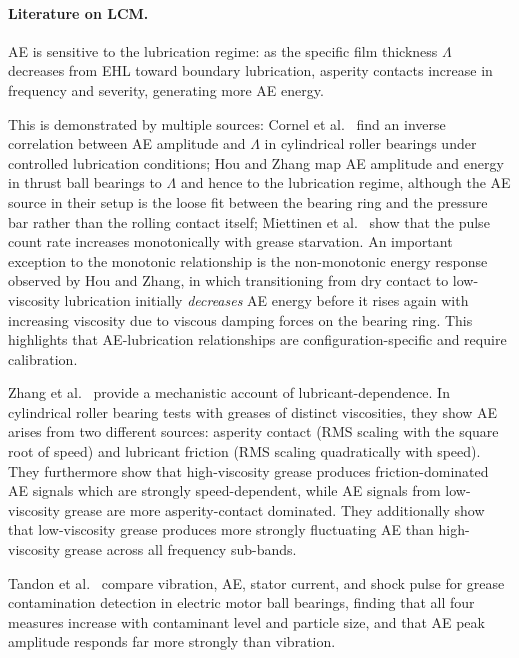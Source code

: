 \paragraph{Literature on LCM.} AE is sensitive to the lubrication regime: as the specific film thickness $\Lambda$ decreases from EHL toward boundary lubrication, asperity contacts increase in frequency and severity, generating more AE energy.

This is demonstrated by multiple sources: Cornel et al.\ \cite{cornel_condition_2021} find an inverse correlation between AE amplitude and $\Lambda$ in cylindrical roller bearings under controlled lubrication conditions; Hou and Zhang \cite{hou_-situ_2025} map AE amplitude and energy in thrust ball bearings to $\Lambda$ and hence to the lubrication regime, although the AE source in their setup is the loose fit between the bearing ring and the pressure bar rather than the rolling contact itself; Miettinen et al.\ \cite{miettinen_analysis_2001} show that the pulse count rate increases monotonically with grease starvation. An important exception to the monotonic relationship is the non-monotonic energy response observed by Hou and Zhang, in which transitioning from dry contact to low-viscosity lubrication initially \textit{decreases} AE energy before it rises again with increasing viscosity due to viscous damping forces on the bearing ring. This highlights that AE-lubrication relationships are configuration-specific and require calibration.

Zhang et al.\ \cite{zhang_coupled_2026} provide a mechanistic account of lubricant-dependence. In cylindrical roller bearing tests with greases of distinct viscosities, they show AE arises from two different sources: asperity contact (RMS scaling with the square root of speed) and lubricant friction (RMS scaling quadratically with speed). They furthermore show that high-viscosity grease produces friction-dominated AE signals which are strongly speed-dependent, while AE signals from low-viscosity grease are more asperity-contact dominated. They additionally show that low-viscosity grease produces more strongly fluctuating AE than high-viscosity grease across all frequency sub-bands.

Tandon et al.\ \cite{tandon_condition_2007} compare vibration, AE, stator current, and shock pulse for grease contamination detection in electric motor ball bearings, finding that all four measures increase with contaminant level and particle size, and that AE peak amplitude responds far more strongly than vibration.


